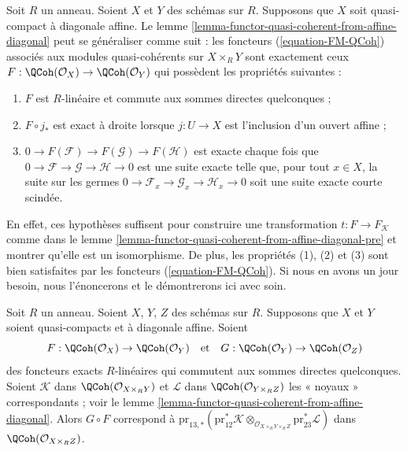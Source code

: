 \begin{remark}
\label{remark-characterize-FM-QCoh}
Soit $R$ un anneau. Soient $X$ et $Y$ des schémas sur $R$. Supposons que $X$
soit quasi-compact à diagonale affine.
Le lemme \ref{lemma-functor-quasi-coherent-from-affine-diagonal} peut
se généraliser comme suit : les foncteurs
(\ref{equation-FM-QCoh}) associés aux modules quasi-cohérents sur
$X \times_R Y$ sont exactement ceux
$F : \QCoh(\mathcal{O}_X) \to \QCoh(\mathcal{O}_Y)$
qui possèdent les propriétés suivantes :
\begin{enumerate}
\item $F$ est $R$-linéaire et commute aux sommes directes quelconques ;
\item $F \circ j_*$ est exact à droite lorsque $j : U \to X$ est
l'inclusion d'un ouvert affine ;
\item $0 \to F(\mathcal{F}) \to F(\mathcal{G}) \to F(\mathcal{H})$
est exacte chaque fois que $0 \to \mathcal{F} \to \mathcal{G} \to \mathcal{H} \to 0$
est une suite exacte telle que, pour tout $x \in X$, la suite sur les germes
$0 \to \mathcal{F}_x \to \mathcal{G}_x \to \mathcal{H}_x \to 0$
soit une suite exacte courte scindée.
\end{enumerate}
En effet, ces hypothèses suffisent pour construire une transformation
$t : F \to F_\mathcal{K}$ comme dans le
lemme \ref{lemma-functor-quasi-coherent-from-affine-diagonal-pre}
et montrer qu'elle est un isomorphisme. De plus, les propriétés (1), (2) et (3)
sont bien satisfaites par les foncteurs (\ref{equation-FM-QCoh}).
Si nous en avons un jour besoin, nous l'énoncerons et le démontrerons ici avec soin.
\end{remark}

\begin{lemma}
\label{lemma-compose-FM-QCoh}
Soit $R$ un anneau. Soient $X$, $Y$, $Z$ des schémas sur $R$. Supposons que
$X$ et $Y$ soient quasi-compacts et à diagonale affine. Soient
$$
F : \QCoh(\mathcal{O}_X) \to \QCoh(\mathcal{O}_Y)
\quad\text{et}\quad
G : \QCoh(\mathcal{O}_Y) \to \QCoh(\mathcal{O}_Z)
$$
des foncteurs exacts $R$-linéaires qui commutent aux sommes directes quelconques.
Soient $\mathcal{K}$ dans $\QCoh(\mathcal{O}_{X \times_R Y})$
et $\mathcal{L}$ dans $\QCoh(\mathcal{O}_{Y \times_R Z})$
les « noyaux » correspondants ; voir le
lemme \ref{lemma-functor-quasi-coherent-from-affine-diagonal}.
Alors $G \circ F$ correspond à
$\text{pr}_{13, *}(\text{pr}_{12}^*\mathcal{K}
\otimes_{\mathcal{O}_{X \times_R Y \times_R Z}}
\text{pr}_{23}^*\mathcal{L})$ dans $\QCoh(\mathcal{O}_{X \times_R Z})$.
\end{lemma}

